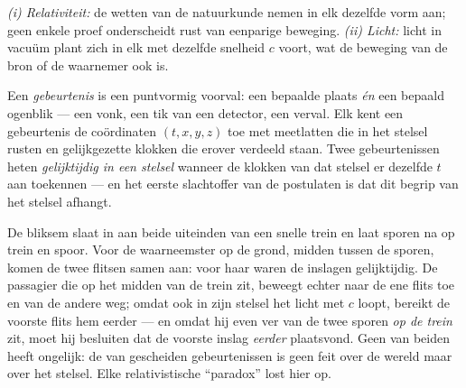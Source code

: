 \begin{theorem}\label{thm:b3:relativistic-kinematics:postulates}
\emph{(i) Relativiteit:} de wetten van de natuurkunde nemen in elk
 dezelfde vorm aan; geen enkele proef onderscheidt rust
van eenparige beweging. \emph{(ii) Licht:} licht in vacuüm plant zich in
elk  met dezelfde snelheid $c$ voort, wat de beweging van
de bron of de waarnemer ook is.
\end{theorem}
\admitted

\begin{definition}\label{def:b3:relativistic-kinematics:event}
Een \emph{gebeurtenis} is een puntvormig voorval: een bepaalde plaats
\emph{én} een bepaald ogenblik --- een vonk, een tik van een detector,
een verval. Elk  kent een gebeurtenis de coördinaten
$(t, x, y, z)$ toe met meetlatten die in het stelsel rusten en
gelijkgezette klokken die erover verdeeld staan. Twee gebeurtenissen
heten \emph{gelijktijdig in een stelsel} wanneer de klokken van dat
stelsel er dezelfde $t$ aan toekennen --- en het eerste slachtoffer van
de postulaten is dat dit begrip van het stelsel afhangt.
\end{definition}

\begin{example}\label{ex:b3:relativistic-kinematics:train}
De bliksem slaat in aan beide uiteinden van een snelle trein en laat
sporen na op trein en spoor. Voor de waarneemster op de grond, midden
tussen de sporen, komen de twee flitsen samen aan: voor haar waren de
inslagen gelijktijdig. De passagier die op het midden van de trein zit,
beweegt echter naar de ene flits toe en van de andere weg; omdat ook in
zijn stelsel het licht met $c$ loopt, bereikt de voorste flits hem
eerder --- en omdat hij even ver van de twee sporen \emph{op de trein}
zit, moet hij besluiten dat de voorste inslag \emph{eerder} plaatsvond.
Geen van beiden heeft ongelijk: de  van gescheiden
gebeurtenissen is geen feit over de wereld maar over het stelsel. Elke
relativistische ``paradox'' lost hier op.
\end{example}

